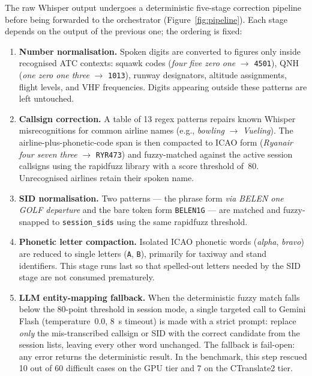 The raw Whisper output undergoes a deterministic five-stage correction pipeline
before being forwarded to the orchestrator (Figure~\ref{fig:pipeline}). Each stage
depends on the output of the previous one; the ordering is fixed:

\begin{enumerate}
  \item \textbf{Number normalisation.} Spoken digits are converted to figures
        only inside recognised ATC contexts: squawk codes
        (\emph{four five zero one} $\rightarrow$ \texttt{4501}), QNH
        (\emph{one zero one three} $\rightarrow$ \texttt{1013}), runway
        designators, altitude assignments, flight levels, and VHF frequencies.
        Digits appearing outside these patterns are left untouched.
  \item \textbf{Callsign correction.} A table of 13 regex patterns repairs known
        Whisper misrecognitions for common airline names (e.g.,
        \emph{bowling} $\rightarrow$ \emph{Vueling}). The airline-plus-phonetic-code
        span is then compacted to ICAO form (\emph{Ryanair four seven three}
        $\rightarrow$ \texttt{RYR473}) and fuzzy-matched against the active session
        callsigns using the rapidfuzz library with a score threshold of~80.
        Unrecognised airlines retain their spoken name.
  \item \textbf{SID normalisation.} Two patterns — the phrase form
        \emph{via BELEN one GOLF departure} and the bare token form
        \texttt{BELEN1G} — are matched and fuzzy-snapped to
        \texttt{session\_sids} using the same rapidfuzz threshold.
  \item \textbf{Phonetic letter compaction.} Isolated ICAO phonetic words
        (\emph{alpha}, \emph{bravo}) are reduced to single letters
        (\texttt{A}, \texttt{B}), primarily for taxiway and stand identifiers.
        This stage runs last so that spelled-out letters needed by the SID stage
        are not consumed prematurely.
  \item \textbf{LLM entity-mapping fallback.} When the deterministic fuzzy match
        falls below the 80-point threshold in session mode, a single targeted call
        to Gemini Flash (temperature~0.0, 8~s timeout) is made with a strict
        prompt: replace \emph{only} the mis-transcribed callsign or SID with the
        correct candidate from the session lists, leaving every other word
        unchanged. The fallback is fail-open: any error returns the deterministic
        result. In the benchmark, this step rescued 10 out of 60 difficult cases
        on the GPU tier and 7 on the CTranslate2 tier.
\end{enumerate}

